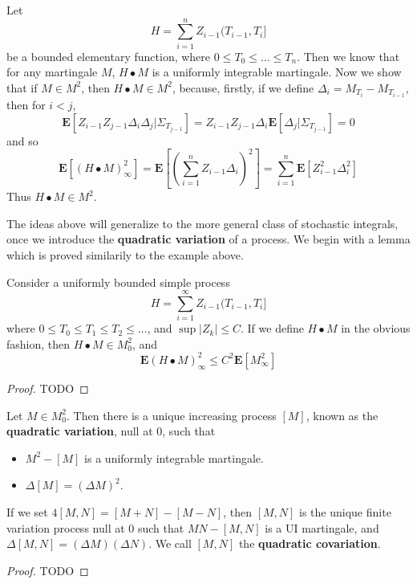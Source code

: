 \begin{example}
    Let
    \[ H = \sum_{i = 1}^n Z_{i-1}(T_{i-1},T_i] \]
    be a bounded elementary function, where $0 \leq T_0 \leq \dots \leq T_n$. Then we know that for any martingale $M$, $H \bullet M$ is a uniformly integrable martingale. Now we show that if $M \in M^2$, then $H \bullet M \in M^2$, because, firstly, if we define $\Delta_i = M_{T_i} - M_{T_{i-1}}$, then for $i < j$,
    \[ \mathbf{E}[Z_{i-1} Z_{j-1} \Delta_i \Delta_j | \Sigma_{T_{j-1}}] = Z_{i-1} Z_{j-1} \Delta_i \mathbf{E}[\Delta_j | \Sigma_{T_{j-1}}] = 0 \]
    and so
    \[ \mathbf{E}[(H \bullet M)_\infty^2] = \mathbf{E} \left[ \left( \sum_{i = 1}^n Z_{i-1} \Delta_i \right)^2 \right] = \sum_{i = 1}^n \mathbf{E} [Z_{i-1}^2 \Delta_i^2] \]
    Thus $H \bullet M \in M^2$.
\end{example}

The ideas above will generalize to the more general class of stochastic integrals, once we introduce the {\bf quadratic variation} of a process. We begin with a lemma which is proved similarily to the example above.

\begin{lemma}
    Consider a uniformly bounded simple process
    \[ H = \sum_{i = 1}^\infty Z_{i-1} (T_{i-1},T_i] \]
    where $0 \leq T_0 \leq T_1 \leq T_2 \leq \dots$, and $\sup |Z_k| \leq C$. If we define $H \bullet M$ in the obvious fashion, then $H \bullet M \in M^2_0$, and
    \[ \mathbf{E} (H \bullet M)^2_\infty \leq C^2 \mathbf{E}[M^2_\infty] \]
\end{lemma}
\begin{proof}
    TODO
\end{proof}

\begin{theorem}
    Let $M \in M^2_0$. Then there is a unique increasing process $[M]$, known as the {\bf quadratic variation}, null at 0, such that
    \begin{itemize}
        \item $M^2 - [M]$ is a uniformly integrable martingale.
        \item $\Delta [M] = (\Delta M)^2$.
    \end{itemize}
    If we set $4[M,N] = [M + N] - [M - N]$, then $[M,N]$ is the unique finite variation process null at 0 such that $MN - [M,N]$ is a UI martingale, and $\Delta [M,N] = (\Delta M)(\Delta N)$. We call $[M,N]$ the {\bf quadratic covariation}.
\end{theorem}
\begin{proof}
    TODO
\end{proof}

